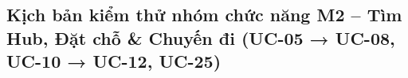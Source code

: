 \subsection{Kịch bản kiểm thử nhóm chức năng M2 – Tìm Hub, Đặt chỗ \& Chuyến đi (UC-05 → UC-08, UC-10 → UC-12, UC-25)}
